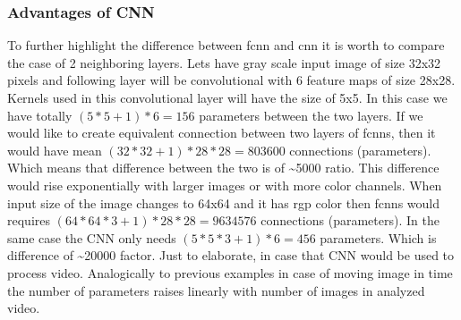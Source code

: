 \documentclass[11pt]{article}
\begin{document}
\subsubsection{Advantages of CNN}
\label{sec:orge91dd5f}
To further highlight the difference between \gls{fcnn} and \gls{cnn} it is worth to compare the case of 2 neighboring layers.
Lets have gray scale input image of size 32x32 pixels and following layer will be convolutional with 6 feature maps of size 28x28. Kernels used in this convolutional layer will have the size of 5x5. In this case we have totally \((5 * 5 + 1) * 6 = 156\) parameters between the two layers.
If we would like to create equivalent connection between two layers of \glspl{fcnn}, then it would have mean \((32 * 32 + 1) * 28 * 28 = 803600\) connections (parameters). Which means that difference between the two is of \textasciitilde{}5000 ratio.
This difference would rise exponentially with larger images or with more color channels. When input size of the image changes to 64x64 and it has \gls{rgp} color then \glspl{fcnn} would requires \((64 * 64 * 3 + 1) * 28 * 28 = 9634576\) connections (parameters). In the same case the CNN only needs \((5 * 5 * 3 + 1) * 6 = 456\) parameters. Which is difference of \textasciitilde{}20000 factor.
Just to elaborate, in case that CNN would be used to process video. Analogically to previous examples in case of moving image in time the number of parameters raises linearly with number of images in analyzed video.
\end{document}
